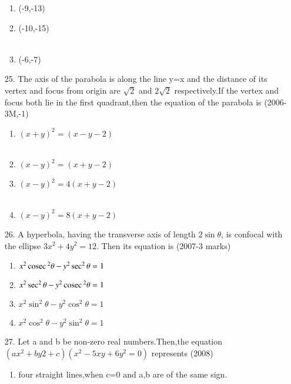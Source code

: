 \documentclass[journal,12pt,twocolumn]{IEEEtran}
\theoremstyle{remark}
\begin{document}
\begin{enumerate}
\begin{multicols}{2}
\begin{enumerate}
    \item (-9,-13)
    \item(-10,-15)\\\\
    \item(-6,-7)
\end{enumerate}
\end{multicols}
\item[25.] The axis of the parabola is along the line y=x and the distance of its vertex and focus from  origin are $\sqrt2$ and $2\sqrt2$  respectively.If the vertex and focus both lie in the first quadrant,then the equation of the parabola is \hfill{(2006-3M,-1)}
\begin{multicols}{2}
\begin{enumerate}
    \item $(x+y)^{2}=(x-y-2)$\\\\
    \item $(x-y)^{2}=(x+y-2)$
    \item $(x-y)^{2}=4(x+y-2)$\\\\
    \item $(x-y)^{2}=8(x+y-2)$
\end{enumerate}
\end{multicols}
\item[26.] A hyperbola, having the transverse axis of length $2\sin\theta$, is confocal with the ellipse $3x^{2}+4y^{2}=12$. Then its equation is \hfill{(2007-3 marks)}
\begin{enumerate}
    \item ${x^{2}\,\text{cosec}\,^{2}\theta}-{y^{2}\sec^{2}\theta=1}$\\
    \item $x^{2}\sec^{2}\theta-y^{2}\,\text{cosec}\,^{2}\theta=1$\\
    \item $x^{2}\sin^{2}\theta-y^{2}\cos^{2}\theta=1$\\
    \item $x^{2}\cos^{2}\theta-y^{2}\sin^{2}\theta=1$\\
\end{enumerate}
\item[27.] Let a and b be non-zero real numbers.Then,the equation $(ax^{2}+by{2}+c)(x^{2}-5xy+6y^{2}=0)$ represents \hfill{(2008)}
\begin{enumerate}
    \item four straight lines,when c=0 and a,b are of the same sign.\\

\end{enumerate}
\end{enumerate}
\end{document}

